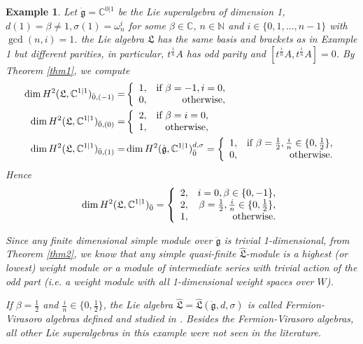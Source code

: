 \documentclass[1p]{elsarticle}
\numberwithin{equation}{section}
\def\dg{\dot{\mathfrak{g}}}
\def\ddg{\ddot{\mathfrak{g}}}
\def\fL{\mathfrak{L}}
\def\bC{\mathbb{C}}
\def\bN{\mathbb{N}}
\def\hL{\hat{\fL}}
\newtheorem{exam}{Example}
\begin{document}
\begin{exam}Let $\dg=\bC^{0|1}$ be the Lie superalgebra of dimension 1,  $d(1)=\beta\ne 1, \sigma(1)=\omega_n^i $ for some $\beta\in \bC$, $n\in \bN$ and $i\in \{0,1,\ldots,n-1\}$ with $\gcd(n,i)=1$. the Lie algebra $\fL$ has the same basis and brackets as in Example 1 but different parities, in particular, $ t^{\frac in}A$ has odd parity and $[ t^{\frac in}A, t^{\frac in}A]=0$. By Theorem \ref{thm1},  we compute 
	$$\begin{aligned}\dim H^2(\fL,\bC^{1|1})_{\bar 0,(-1)}=&\left\{\begin{array}{lr}1,&\text{\rm if } \beta=-1,i=0,\\0,& {\rm otherwise}, \end{array}\right.\\
	\dim H^2(\fL,\bC^{1|1})_{\bar 0,(0)}=&\left\{\begin{array}{lr}2,& \text{\rm if }\beta=i=0,\\ 1, &{\rm otherwise}, \end{array}\right. \\
	\dim H^2(\fL,\bC^{1|1})_{\bar 0,(1)}=&\dim H^2(\dg,\bC^{1|1})_{\bar 0}^{d,\sigma}=\left\{\begin{array}{lr}1,&\text{\rm if }\beta=\frac 12,\frac in\in \{0,\frac 12\},\\ 0,& {\rm otherwise.}\end{array}\right.\end{aligned}$$ 
	 Hence $$\dim H^2(\fL,\bC^{1|1})_{\bar 0}=\left\{\begin{array}{lr}2,& i=0, \beta\in\{0,-1\}, \\ 2,&\beta=\frac 12,\frac in\in \{0,\frac 12\},\\1,& {\rm otherwise}. \end{array}\right.$$

Since any finite dimensional simple module  over $\ddg$ is trivial 1-dimensional, from Theorem \ref{thm2}, we know that any simple quasi-finite $\hL$-module is a highest (or lowest) weight module or a module of intermediate series with trivial action of the odd part (i.e. a weight module with all 1-dimensional weight spaces over $W$).

If $\beta=\frac 12$ and $ \frac in\in \{0,\frac 12\}$, the Lie algebra $\hL=\hL(\dg,d,\sigma)$ is called Fermion-Virasoro algebras defined and studied in \cite{DCL,XZ}. Besides the Fermion-Virasoro algebras, all other Lie superalgebras  in this example were not seen in the literature.
 
\end{exam}
\end{document}
